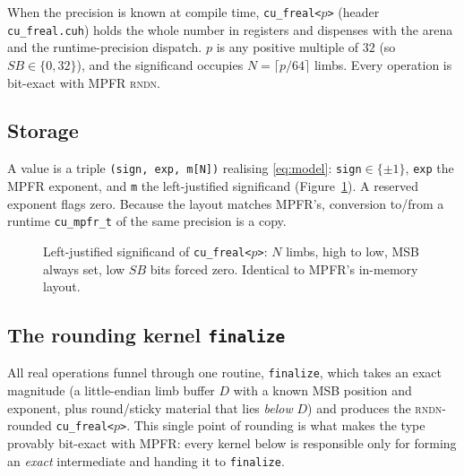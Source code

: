 \documentclass[11pt,a4paper]{article}
\newcommand{\code}[1]{\texttt{#1}}
\newcommand{\PB}{\ensuremath{p}}
\newcommand{\Nlimb}{\ensuremath{N}}
\newcommand{\rndn}{\textsc{rndn}}
\begin{document}
When the precision is known at compile time, \code{cu\_freal<\PB>} (header
\code{cu\_freal.cuh}) holds the whole number in registers and dispenses with the
arena and the runtime-precision dispatch. \PB{} is any positive multiple of $32$
(so $\mathit{SB}\in\{0,32\}$), and the significand occupies $\Nlimb=\lceil\PB/64\rceil$
limbs. Every operation is bit-exact with MPFR \rndn.

\subsection{Storage}
\label{sec:freal-storage}

A value is a triple \code{(sign, exp, m[N])} realising \eqref{eq:model}:
\code{sign}$\in\{\pm1\}$, \code{exp} the MPFR exponent, and \code{m} the
left-justified significand (Figure~\ref{fig:layout}). A reserved exponent flags
zero. Because the layout matches MPFR's, conversion to/from a runtime
\code{cu\_mpfr\_t} of the same precision is a copy.

\begin{figure}[h]
\centering
{}
\caption{Left-justified significand of \code{cu\_freal<\PB>}: $\Nlimb$ limbs,
high to low, MSB always set, low $\mathit{SB}$ bits forced zero. Identical to
MPFR's in-memory layout.}
\label{fig:layout}
\end{figure}

\subsection{The rounding kernel \texttt{finalize}}
\label{sec:finalize}

All real operations funnel through one routine, \code{finalize}, which takes an
exact magnitude (a little-endian limb buffer $D$ with a known MSB position and
exponent, plus round/sticky material that lies \emph{below} $D$) and produces the
\rndn-rounded \code{cu\_freal<\PB>}. This single point of rounding is what makes
the type provably bit-exact with MPFR: every kernel below is responsible only for
forming an \emph{exact} intermediate and handing it to \code{finalize}.
\end{document}
